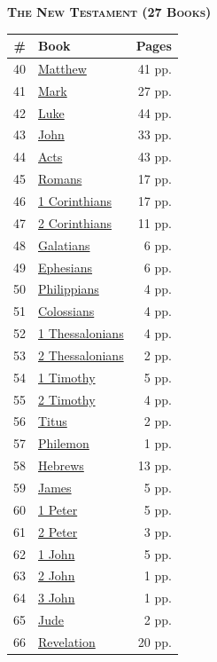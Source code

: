 \documentclass[10pt,letterpaper]{article}
\begin{document}
\begin{minipage}[t]{0.485\textwidth}
\centering
{\bfseries\scshape The New Testament \footnotesize(27 Books)}\\[0.4em]
\begin{tabularx}{\linewidth}{r X r}
\toprule
\textbf{\#} & \textbf{Book} & \textbf{Pages} \\
\midrule
40 & \href{books/40_Matthew.pdf}{Matthew} & 41 pp. \\
41 & \href{books/41_Mark.pdf}{Mark} & 27 pp. \\
42 & \href{books/42_Luke.pdf}{Luke} & 44 pp. \\
43 & \href{books/43_John.pdf}{John} & 33 pp. \\
44 & \href{books/44_Acts.pdf}{Acts} & 43 pp. \\
45 & \href{books/45_Romans.pdf}{Romans} & 17 pp. \\
46 & \href{books/46_1_Corinthians.pdf}{1 Corinthians} & 17 pp. \\
47 & \href{books/47_2_Corinthians.pdf}{2 Corinthians} & 11 pp. \\
48 & \href{books/48_Galatians.pdf}{Galatians} & 6 pp. \\
49 & \href{books/49_Ephesians.pdf}{Ephesians} & 6 pp. \\
50 & \href{books/50_Philippians.pdf}{Philippians} & 4 pp. \\
51 & \href{books/51_Colossians.pdf}{Colossians} & 4 pp. \\
52 & \href{books/52_1_Thessalonians.pdf}{1 Thessalonians} & 4 pp. \\
53 & \href{books/53_2_Thessalonians.pdf}{2 Thessalonians} & 2 pp. \\
54 & \href{books/54_1_Timothy.pdf}{1 Timothy} & 5 pp. \\
55 & \href{books/55_2_Timothy.pdf}{2 Timothy} & 4 pp. \\
56 & \href{books/56_Titus.pdf}{Titus} & 2 pp. \\
57 & \href{books/57_Philemon.pdf}{Philemon} & 1 pp. \\
58 & \href{books/58_Hebrews.pdf}{Hebrews} & 13 pp. \\
59 & \href{books/59_James.pdf}{James} & 5 pp. \\
60 & \href{books/60_1_Peter.pdf}{1 Peter} & 5 pp. \\
61 & \href{books/61_2_Peter.pdf}{2 Peter} & 3 pp. \\
62 & \href{books/62_1_John.pdf}{1 John} & 5 pp. \\
63 & \href{books/63_2_John.pdf}{2 John} & 1 pp. \\
64 & \href{books/64_3_John.pdf}{3 John} & 1 pp. \\
65 & \href{books/65_Jude.pdf}{Jude} & 2 pp. \\
66 & \href{books/66_Revelation.pdf}{Revelation} & 20 pp. \\
\bottomrule
\end{tabularx}


\end{minipage}
\end{document}

